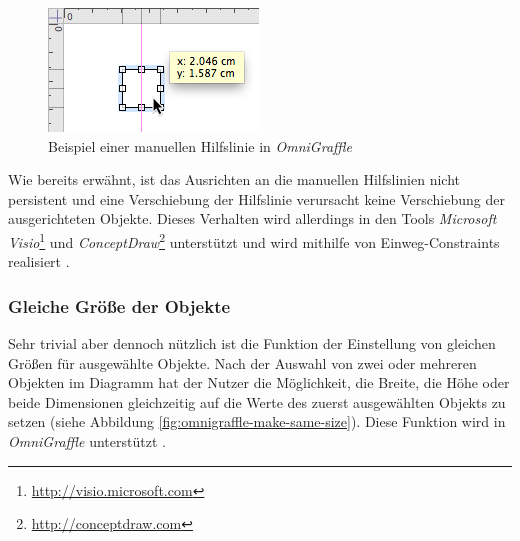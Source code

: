 \begin{figure}[hbt]
    \centering
    \includegraphics{assets/omnigraffle-manual-guides.png}
    \caption{Beispiel einer manuellen Hilfslinie in \textit{OmniGraffle}}
    \label{fig:omnigraffle-manual-guides}
\end{figure}

Wie bereits erwähnt, ist das Ausrichten an die manuellen Hilfslinien nicht persistent und eine Verschiebung der Hilfslinie verursacht keine Verschiebung der ausgerichteten Objekte. Dieses Verhalten wird allerdings in den Tools \textit{Microsoft Visio}\footnote{\url{http://visio.microsoft.com}} und \textit{ConceptDraw}\footnote{\url{http://conceptdraw.com}} unterstützt und wird mithilfe von Einweg-Constraints realisiert \cite[S.20]{Maier12A-Pattern-based}.

\subsubsection{Gleiche Größe der Objekte}

Sehr trivial aber dennoch nützlich ist die Funktion der Einstellung von gleichen Größen für ausgewählte Objekte. Nach der Auswahl von zwei oder mehreren Objekten im Diagramm hat der Nutzer die Möglichkeit, die Breite, die Höhe oder beide Dimensionen gleichzeitig auf die Werte des zuerst ausgewählten Objekts zu setzen (siehe Abbildung \ref{fig:omnigraffle-make-same-size}). Diese Funktion wird in \textit{OmniGraffle} unterstützt \cite{Olsen10OmniGraffle}.

